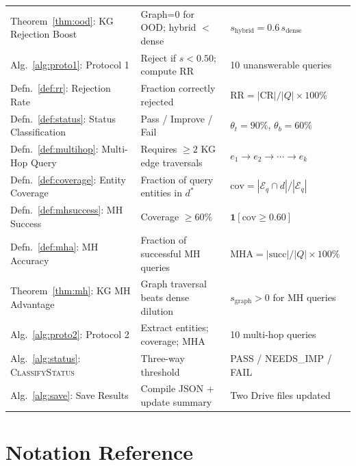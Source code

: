 \documentclass[12pt,a4paper]{article}
\theoremstyle{definition}
\theoremstyle{plain}
\theoremstyle{remark}
\begin{document}
\begin{longtable}{p{4.5cm} p{5.5cm} p{4.2cm}}
Theorem~\ref{thm:ood}: KG Rejection Boost
  & Graph=0 for OOD; hybrid $<$ dense
  & $s_\text{hybrid}=0.6\,s_\text{dense}$ \\[3pt]

Alg.~\ref{alg:proto1}: Protocol 1
  & Reject if $s<0.50$; compute RR
  & 10 unanswerable queries \\[3pt]

Defn.~\ref{def:rr}: Rejection Rate
  & Fraction correctly rejected
  & $\mathrm{RR}=|\mathrm{CR}|/|Q|\times100\%$ \\[3pt]

Defn.~\ref{def:status}: Status Classification
  & Pass / Improve / Fail
  & $\theta_t=90\%$, $\theta_b=60\%$ \\[3pt]

Defn.~\ref{def:multihop}: Multi-Hop Query
  & Requires $\geq2$ KG edge traversals
  & $e_1\to e_2\to\cdots\to e_k$ \\[3pt]

Defn.~\ref{def:coverage}: Entity Coverage
  & Fraction of query entities in $d^*$
  & $\mathrm{cov}=|\mathcal{E}_q\cap d|/|\mathcal{E}_q|$ \\[3pt]

Defn.~\ref{def:mhsuccess}: MH Success
  & Coverage $\geq60\%$
  & $\mathbf{1}[\mathrm{cov}\geq0.60]$ \\[3pt]

Defn.~\ref{def:mha}: MH Accuracy
  & Fraction of successful MH queries
  & $\mathrm{MHA}=|\text{succ}|/|Q|\times100\%$ \\[3pt]

Theorem~\ref{thm:mh}: KG MH Advantage
  & Graph traversal beats dense dilution
  & $s_\text{graph}>0$ for MH queries \\[3pt]

Alg.~\ref{alg:proto2}: Protocol 2
  & Extract entities; coverage; MHA
  & 10 multi-hop queries \\[3pt]

Alg.~\ref{alg:status}: \textsc{ClassifyStatus}
  & Three-way threshold
  & PASS / NEEDS\_IMP / FAIL \\[3pt]

Alg.~\ref{alg:save}: Save Results
  & Compile JSON + update summary
  & Two Drive files updated \\

\end{longtable}

\newpage
\section{Notation Reference}
\end{document}
